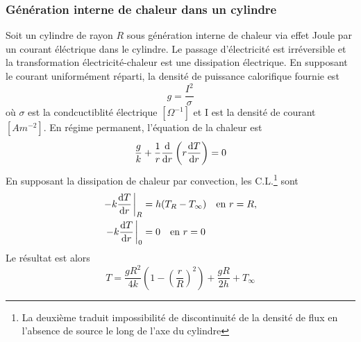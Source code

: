 \documentclass[a4paper,11pt]{report}
\newcommand{\recip}[1]{\frac{1}{#1}}
\begin{document}
      \subsubsection{Génération interne de chaleur dans un cylindre}
        Soit un cylindre de rayon $R$ sous génération interne de chaleur via effet Joule par un courant éléctrique dans le cylindre. Le passage d'électricité est irréversible et la transformation électricité-chaleur est une dissipation électrique. En supposant le courant uniformément réparti, la densité de puissance calorifique fournie est
        \begin{equation}
          g = \frac{I^2}{\sigma}
        \end{equation}
        où $\sigma$ est la condcuctiblité électrique $[\Omega^{-1}]$ et I est la densité de courant $[Am^{-2}]$. En régime permanent, l'équation de la chaleur est
        \begin{equation}
          \frac{g}{k} + \recip{r}\dv{r}\left(r \dv{T}{r}\right) = 0
        \end{equation}
        En supposant la dissipation de chaleur par convection, les C.L.\footnote{La deuxième traduit impossibilité de discontinuité de la densité de flux en l'absence de source le long de l'axe du cylindre} sont
        \begin{equation}
          \begin{aligned}
            -k \dv{T}{r} \eval_R &= h (T_R - T_\infty) \quad \textrm{en } r = R,\\
            -k \dv{T}{r} \eval_0 &= 0 \quad \textrm{en } r = 0
          \end{aligned}
        \end{equation}
        Le résultat est alors
        \begin{equation}
          T = \frac{gR^2}{4k}\left(1-\left(\frac{r}{R}\right)^2\right) + \frac{gR}{2h} + T_\infty
        \end{equation}
\end{document}
